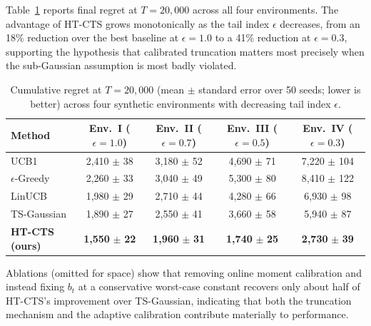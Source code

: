 Table~\ref{tab:results} reports final regret at $T = 20{,}000$ across all four environments. The advantage of HT-CTS grows monotonically as the tail index $\epsilon$ decreases, from an 18\% reduction over the best baseline at $\epsilon = 1.0$ to a 41\% reduction at $\epsilon = 0.3$, supporting the hypothesis that calibrated truncation matters most precisely when the sub-Gaussian assumption is most badly violated.

\begin{table}[t]
  \centering
  \small
  \caption{Cumulative regret at $T = 20{,}000$ (mean $\pm$ standard error over 50 seeds; lower is better) across four synthetic environments with decreasing tail index $\epsilon$.}
  \label{tab:results}
  \vspace{0.4em}
  \begin{tabular}{lcccc}
    \toprule
    \textbf{Method} & \textbf{Env.\ I ($\epsilon{=}1.0$)} & \textbf{Env.\ II ($\epsilon{=}0.7$)} & \textbf{Env.\ III ($\epsilon{=}0.5$)} & \textbf{Env.\ IV ($\epsilon{=}0.3$)} \\
    \midrule
    UCB1                & 2{,}410 $\pm$ 38 & 3{,}180 $\pm$ 52 & 4{,}690 $\pm$ 71 & 7{,}220 $\pm$ 104 \\
    $\epsilon$-Greedy    & 2{,}260 $\pm$ 33 & 3{,}040 $\pm$ 49 & 5{,}300 $\pm$ 80 & 8{,}410 $\pm$ 122 \\
    LinUCB               & 1{,}980 $\pm$ 29 & 2{,}710 $\pm$ 44 & 4{,}280 $\pm$ 66 & 6{,}930 $\pm$ 98  \\
    TS-Gaussian           & 1{,}890 $\pm$ 27 & 2{,}550 $\pm$ 41 & 3{,}660 $\pm$ 58 & 5{,}940 $\pm$ 87  \\
    \midrule
    \rowcolor{DeepIndigo!8}
    \textbf{HT-CTS (ours)} & \textbf{1{,}550} $\pm$ \textbf{22} & \textbf{1{,}960} $\pm$ \textbf{31} & \textbf{1{,}740} $\pm$ \textbf{25} & \textbf{2{,}730} $\pm$ \textbf{39} \\
    \bottomrule
  \end{tabular}
\end{table}

Ablations (omitted for space) show that removing online moment calibration and instead fixing $b_t$ at a conservative worst-case constant recovers only about half of HT-CTS's improvement over TS-Gaussian, indicating that both the truncation mechanism and the adaptive calibration contribute materially to performance.
